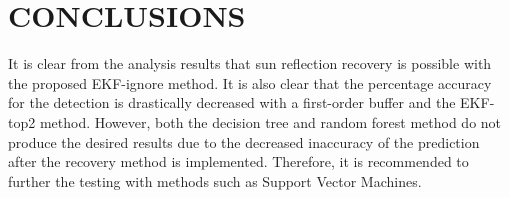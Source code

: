 \documentclass[letterpaper, 10 pt, conference]{ieeeconf}  %
\begin{document}

\section{CONCLUSIONS}
It is clear from the analysis results that sun reflection recovery is possible with the proposed EKF-ignore method. It is also clear that the percentage accuracy for the detection is drastically decreased with a first-order buffer and the EKF-top2 method. However, both the decision tree and random forest method do not produce the desired results due to the decreased inaccuracy of the prediction after the recovery method is implemented. Therefore, it is recommended to further the testing with methods such as Support Vector Machines.

\addtolength{\textheight}{-12cm}   %







\printbibliography[heading=bibintoc]




\end{document}
